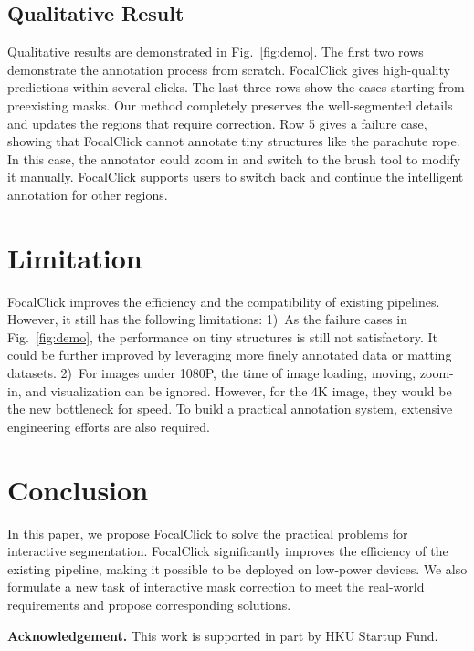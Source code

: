 \documentclass[10pt,twocolumn,letterpaper]{article}
\begin{document}
\subsection{Qualitative Result}
Qualitative results are demonstrated in Fig.~\ref{fig:demo}. The first two rows demonstrate the annotation process from scratch. FocalClick gives high-quality predictions within several clicks. The last three rows show the cases starting from preexisting masks. Our method completely preserves the well-segmented details and updates the regions that require correction. 
Row 5 gives a failure case, showing that FocalClick cannot annotate tiny structures like the parachute rope. In this case, the annotator could zoom in and switch to the brush tool to modify it manually. FocalClick supports users to switch back and continue the intelligent annotation for other regions.   
\vspace{-2mm}
 

\section{Limitation}
FocalClick improves the efficiency and the compatibility of existing pipelines. However, it still has the following limitations: 1)~As the failure cases in Fig.~\ref{fig:demo}, the performance on tiny structures is still not satisfactory. It could be further improved by leveraging more finely annotated data or matting datasets. 2)~For images under 1080P, the time of image loading, moving, zoom-in, and visualization can be ignored. However, for the 4K image, they would be the new bottleneck for speed. To build a practical annotation system, extensive engineering efforts are also required. 
\vspace{-3mm}

\section{Conclusion}
In this paper, we propose FocalClick to solve the practical problems for interactive segmentation. FocalClick significantly improves the efficiency of the existing pipeline, making it possible to be deployed on low-power devices. We also formulate a new task of interactive mask correction to meet the real-world requirements and propose corresponding solutions.

\noindent\textbf{Acknowledgement.} This work is supported in part by HKU Startup Fund.
{\small


}
\end{document}

